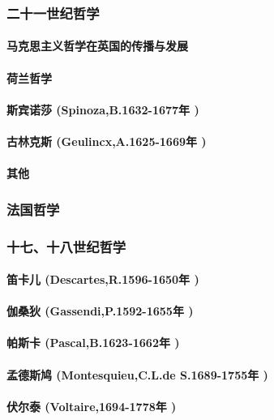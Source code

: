 \documentclass[UTF8]{../RepresentationUniverse}
\begin{document}
\subsubsection{二十一世纪哲学}
    \paragraph{马克思主义哲学在英国的传播与发展}
    \paragraph{荷兰哲学}
    \paragraph{斯宾诺莎 (Spinoza,B.1632-1677年 )}
    \paragraph{古林克斯 (Geulincx,A.1625-1669年 )}
    \paragraph{其他}



\subsubsection{法国哲学}
\subsubsection{十七、十八世纪哲学}
    \paragraph{笛卡儿 (Descartes,R.1596-1650年 )}
    \paragraph{伽桑狄 (Gassendi,P.1592-1655年 )}
    \paragraph{帕斯卡 (Pascal,B.1623-1662年 )}
    \paragraph{孟德斯鸠 (Montesquieu,C.L.de S.1689-1755年 )}
    \paragraph{伏尔泰 (Voltaire,1694-1778年 )}
\end{document}
